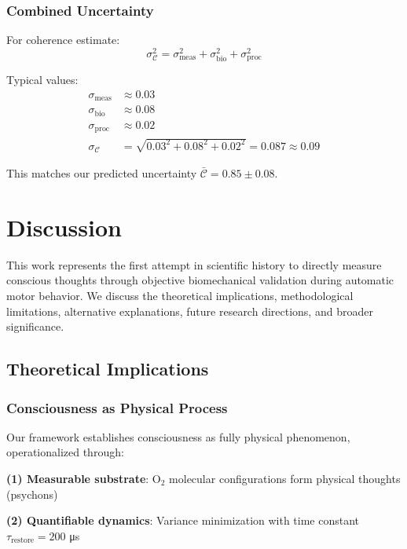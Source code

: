 \documentclass[11pt,onecolumn]{article}
\begin{document}
\subsubsection{Combined Uncertainty}

For coherence estimate:
\begin{equation}
\sigma_{\mathcal{C}}^2 = \sigma_{\text{meas}}^2 + \sigma_{\text{bio}}^2 + \sigma_{\text{proc}}^2
\end{equation}

Typical values:
\begin{align}
\sigma_{\text{meas}} &\approx 0.03 \\
\sigma_{\text{bio}} &\approx 0.08 \\
\sigma_{\text{proc}} &\approx 0.02 \\
\sigma_{\mathcal{C}} &= \sqrt{0.03^2 + 0.08^2 + 0.02^2} = 0.087 \approx 0.09
\end{align}

This matches our predicted uncertainty $\bar{\mathcal{C}} = 0.85 \pm 0.08$.

\clearpage

\section{Discussion}

This work represents the first attempt in scientific history to directly measure conscious thoughts through objective biomechanical validation during automatic motor behavior. We discuss the theoretical implications, methodological limitations, alternative explanations, future research directions, and broader significance.

\subsection{Theoretical Implications}

\subsubsection{Consciousness as Physical Process}

Our framework establishes consciousness as fully physical phenomenon, operationalized through:

\textbf{(1) Measurable substrate}: O$_2$ molecular configurations form physical thoughts (psychons)

\textbf{(2) Quantifiable dynamics}: Variance minimization with time constant $\tau_{\text{restore}} = 200$ μs
\end{document}
